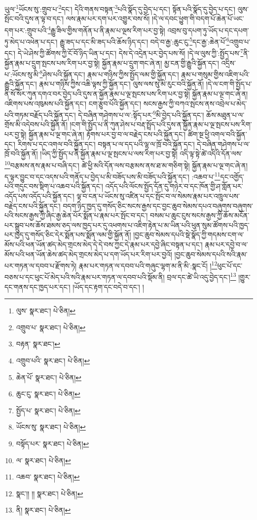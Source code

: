 ཡུལ་\footnote{ལུས་  སྣར་ཐང་།  པེ་ཅིན། }ཡོངས་སུ་:གྲུབ་པ་\footnote{འགྲུབ་པ་  སྣར་ཐང་།  པེ་ཅིན། }དང་། དེའི་གནས་བསྟན་\footnote{བརྟན་  སྣར་ཐང་། }པའི་སྣོད་དུ་བྱེད་པ་དང་། སྟོན་པའི་སྣོད་དུ་བྱེད་པ་དང་། ལུས་སྤོང་བའི་དུས་ན་ལྟ་བ་དང་། ལས་རྣམ་པར་དག་པར་འགྱུར་བས་སོ། །དེ་ལ་དབང་ཕྱུག་གི་བདག་པོ་ཆེན་པོ་ཡང་དག་པར་:གྲུབ་པའི་\footnote{འགྲུབ་པའི་  སྣར་ཐང་།  པེ་ཅིན། }རྒྱུ་ཟིལ་གྱིས་གནོན་པ་ནི་རྣམ་པ་ལྔས་རིག་པར་བྱ་སྟེ། འབྲས་བུ་དཔག་ཏུ་ཡོད་པ་དང་དཔག་ཏུ་མེད་པ་འཕེན་པ་དང་། རྒྱུ་ཟད་པ་དང་མི་ཟད་པའི་ཆོས་ཉིད་དང་། བདེ་བ་རྒྱ་:ཆུང་ངུ་\footnote{ཆེན་པོ་  སྣར་ཐང་།  པེ་ཅིན། }དང་རྒྱ་:ཆེན་པོ་\footnote{ཆུང་ངུ་  སྣར་ཐང་།  པེ་ཅིན། }འགྲུབ་པ་དང་། དེ་ཡེ་ཤེས་ཀྱི་ཚོགས་ཀྱི་ངོ་བོ་ཉིད་ཡིན་པ་དང་། དེས་དེ་འདྲེན་པར་བྱེད་པས་སོ། །དེ་ལ་ལུས་ཀྱི་:སྤྱོད་པས་\footnote{སྤྱོད་པ་  སྣར་ཐང་།  པེ་ཅིན། }ནི་སྐྱོན་རྣམ་པ་དྲུག་སྤངས་པས་རིག་པར་བྱ་སྟེ། སྐྱོན་རྣམ་པ་དྲུག་གང་ཞེ་ན། མྱ་ངན་གྱི་རྒྱུའི་སྐྱོན་དང་། འདྲིས་པ་:ཡོངས་སུ་མི་\footnote{ཡོངས་སུ་  སྣར་ཐང་།  པེ་ཅིན། }ཤེས་པའི་སྐྱོན་དང་། རྣམ་པ་གཉིས་ཀྱིས་སྤྱོད་ལམ་གྱི་སྐྱོན་དང་། རྣམ་པ་གསུམ་གྱིས་འཇིག་པའི་རྒྱུའི་སྐྱོན་དང་། རྣམ་པ་གཉིས་ཀྱིས་འཆི་ལྟས་ཀྱི་སྐྱོན་དང་། ལུས་ལས་སུ་མི་རུང་བའི་སྐྱོན་ནོ། །དེ་ལ་ངག་གི་སྤྱོད་པ་ནི་སོ་སོར་ཀུན་དགའ་བར་བྱེད་པའི་དུས་ན་སྐྱོན་རྣམ་པ་ལྔ་སྤངས་པས་རིག་པར་བྱ་སྟེ། སྐྱོན་རྣམ་པ་ལྔ་གང་ཞེ་ན། འཇིགས་པས་འཁུམས་པའི་སྐྱོན་དང་། ངག་རྩུབ་པོའི་སྐྱོན་དང་། སངས་རྒྱས་ཀྱི་བཀའ་སྤངས་ནས་འབྲེལ་པ་མེད་པའི་གཏམ་བརྗོད་པའི་སྐྱོན་དང་། དེ་བཞིན་གཤེགས་པ་ལ་:སྟོད་པར་\footnote{བསྟོད་པར་  སྣར་ཐང་།  པེ་ཅིན། }མི་བྱེད་པའི་སྐྱོན་དང་། ཆོས་མཐུན་པ་ལ་གྲོས་མི་འདེབས་པའི་སྐྱོན་ནོ། །ངག་གི་སྤྱོད་པ་ནི་ཀུན་ཤེས་པ་བརྡ་སྤྲོད་པའི་དུས་ན་སྐྱོན་རྣམ་པ་ལྔ་སྤངས་པས་རིག་པར་བྱ་སྟེ། སྐྱོན་རྣམ་པ་ལྔ་གང་ཞེ་ན། རྟོགས་པར་བྱ་བ་ལ་བརྗེད་ངས་པའི་སྐྱོན་དང་། ཚིག་སྔ་ཕྱི་འགལ་བའི་སྐྱོན་དང་། རིགས་པ་དང་འགལ་བའི་སྐྱོན་དང་། བསྟན་པ་ལ་དད་པའི་ལྷ་ལ་ཁྲོ་བའི་སྐྱོན་དང་། དེ་བཞིན་གཤེགས་པ་ལ་ཁྲོ་བའི་སྐྱོན་ནོ། །ཡིད་ཀྱི་སྤྱོད་པ་ནི་སྐྱོན་རྣམ་པ་ལྔ་སྤངས་པ་ལས་རིག་པར་བྱ་སྟེ། འདི་ལྟ་སྟེ་ཚེ་འདིའི་དོན་ལས་\footnote{ལ་  སྣར་ཐང་།  པེ་ཅིན། }བརྩམས་ནས་རྣམ་པ་བཞི་དང་། ཚེ་ཕྱི་མའི་དོན་ལས་བརྩམས་ནས་ཐ་མ་གཅིག་སྟེ། སྐྱོན་རྣམ་པ་ལྔ་གང་ཞེ་ན། ད་ལྟར་བྱུང་བ་དང་འདས་པའི་གནོད་པ་བྱེད་པ་མི་བཟོད་པས་མི་བཟོད་པའི་སྐྱོན་དང་། :འཆབ་པ་\footnote{འཆབ་  སྣར་ཐང་།  པེ་ཅིན། }དང་འགྱོད་པའི་གདུང་བས་སྡིག་པ་འཆབ་པའི་སྐྱོན་དང་། འདོད་པའི་ལོངས་སྤྱོད་དོན་དུ་གཉེར་བ་དང་ཁོན་གྱི་ཤ་གློན་པར་འདོད་པས་འདོད་པའི་སྐྱོན་དང་། ལྟ་བ་ངན་པ་ཡོངས་སུ་འཛིན་པ་དང་སྤོང་བ་ལ་སེམས་རྣམ་པར་འཁྲུལ་པས་བརྗེད་ངས་པའི་སྐྱོན་དང་། བདག་ཉིད་ཁྱད་དུ་གསོད་ཅིང་སངས་རྒྱས་དང་བྱང་ཆུབ་སེམས་དཔའ་བཞུགས་བཞུགས་པའི་སངས་རྒྱས་ཀྱི་ཞིང་རྒྱ་ཆེན་པོར་སྨོན་པ་རྣམ་པར་སྤོང་བ་དང་། བསམ་པ་ཆུང་ངུས་སངས་རྒྱས་ཀྱི་ཆོས་མངོན་པར་སྒྲུབ་པས་ཆོས་ཐམས་ཅད་ལས་ཁྱད་པར་དུ་འཕགས་པ་འཇིག་རྟེན་པ་མ་ཡིན་པའི་ཕུན་སུམ་ཚོགས་པའི་ཁྱད་པར་ཁྱད་དུ་གསོད་ཅིང་དེར་སྨོན་པས་སྨོན་ལམ་གྱི་སྐྱོན་ནོ། །བྱང་ཆུབ་སེམས་དཔའི་སྡེ་སྣོད་ཀྱི་གདམས་ངག་ལ་མོས་པའི་ཕན་ཡོན་ཚད་མེད་གྲངས་མེད་དེ་དེ་བས་ཀྱང་དེ་རྣམ་པར་དབྱེ་ཞིང་བསྟན་པ་དང་། རྣམ་པར་དབྱེ་བ་ལ་མོས་པའི་ཕན་ཡོན་ཆེས་ཚད་མེད་གྲངས་མེད་པ་དག་ཡོད་པར་རིག་པར་བྱའོ། །བྱང་ཆུབ་སེམས་དཔའི་སའི་རྣམ་པར་གཏན་ལ་དབབ་པ་རྫོགས་ཏེ། རྣམ་པར་གཏན་ལ་དབབ་པའི་གཞུང་ལྷག་མ་ནི་མི་:སྣང་ངོ། །\footnote{སྣང་།། །།  སྣར་ཐང་།  པེ་ཅིན། }ཕུང་པོ་དང་བཅས་པ་དང་ཕུང་པོ་མེད་པའི་སའི་རྣམ་པར་གཏན་ལ་དབབ་པའི་སྡོམ་ནི། བྲལ་དང་ཚེ་ཡི་འདུ་བྱེད་དང་།\footnote{ནི།  སྣར་ཐང་།  པེ་ཅིན། } །གྱུར་དང་གནས་དང་ཁྱད་པར་དང་། །ཡོད་དང་རྟག་དང་བདེ་བ་དང་། །
